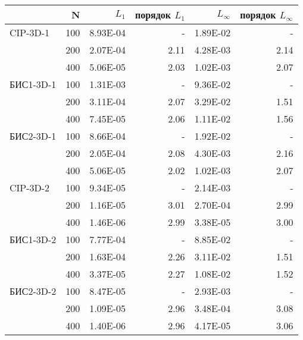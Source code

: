 \begin{tabular}{lrrrrr}

 & N & $L_1$ & порядок $L_1$ & $L_{\infty}$ & порядок $L_{\infty}$ \\ 
 \hline
CIP-3D-1 & 100 & 8.93E-04 & - & 1.89E-02 & - \\ 
 & 200 & 2.07E-04 & 2.11 & 4.28E-03 & 2.14 \\
 & 400 & 5.06E-05 & 2.03 & 1.02E-03 & 2.07 \\ 
 \hline
БИС1-3D-1 & 100 & 1.31E-03 & - & 9.36E-02 & - \\ 
 & 200 & 3.11E-04 & 2.07 & 3.29E-02 & 1.51 \\ 
 & 400 & 7.45E-05 & 2.06 & 1.11E-02 & 1.56 \\ 
 \hline
БИС2-3D-1 & 100 & 8.66E-04 & - & 1.92E-02 & - \\ 
 & 200 & 2.05E-04 & 2.08 & 4.30E-03 & 2.16 \\ 
 & 400 & 5.06E-05 & 2.02 & 1.02E-03 & 2.07 \\ 
 \hline
CIP-3D-2 & 100 & 9.34E-05 & - & 2.14E-03 & - \\ 
 & 200 & 1.16E-05 & 3.01 & 2.70E-04 & 2.99 \\ 
 & 400 & 1.46E-06 & 2.99 & 3.38E-05 & 3.00 \\ 
 \hline
БИС1-3D-2 & 100 & 7.77E-04 & - & 8.85E-02 & - \\ 
 & 200 & 1.63E-04 & 2.26 & 3.11E-02 & 1.51 \\ 
 & 400 & 3.37E-05 & 2.27 & 1.08E-02 & 1.52 \\ 
 \hline
БИС2-3D-2 & 100 & 8.47E-05 & - & 2.93E-03 & - \\ 
 & 200 & 1.09E-05 & 2.96 & 3.48E-04 & 3.08 \\ 
 & 400 & 1.40E-06 & 2.96 & 4.17E-05 & 3.06 \\ 
\end{tabular}
